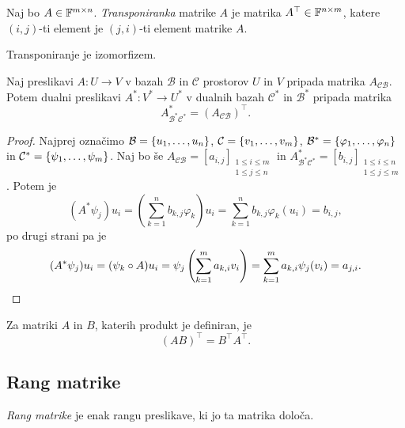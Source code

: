 \documentclass[12pt, a4paper]{article}
\begin{document}
\begin{definicija}
Naj bo $A\in\mathbb{F}^{m\times n}$. \emph{Transponiranka} matrike $A$ je matrika $A^\top\in\mathbb{F}^{n\times m}$, katere $(i,j)$-ti element je $(j,i)$-ti element matrike $A$.
\end{definicija}

\begin{posledica}
Transponiranje je izomorfizem.
\end{posledica}

\begin{izrek}
Naj preslikavi $A\colon U\to V$ v bazah $\mathcal{B}$ in $\mathcal{C}$ prostorov $U$ in $V$ pripada matrika $A_{\mathcal{CB}}$. Potem dualni preslikavi $A^*\colon V^*\to U^*$ v dualnih bazah $\mathcal{C}^*$ in $\mathcal{B}^*$ pripada matrika
\[
A^*_{\mathcal{B}^*\mathcal{C}^*}=(A_{\mathcal{CB}})^\top.
\]
\end{izrek}

\begin{proof}
Najprej označimo $\mathcal{B}=\left\{u_1,\dots,u_n\right\}$, $\mathcal{C}=\left\{v_1,\dots,v_m\right\}$, $\mathcal{B}^*=\left\{\varphi_1,\dots,\varphi_n\right\}$ in $\mathcal{C}^*=\left\{\psi_1,\dots,\psi_m\right\}$. Naj bo še $A_{\mathcal{CB}}=[a_{i,j}]_{
\substack{
1\leq i\leq m \\
1\leq j\leq n}}$ in 
$A^*_{\mathcal{B}^*\mathcal{C}^*}=[b_{i,j}]_{
\substack{
1\leq i\leq n \\
1\leq j\leq m}}$. Potem je
\[
(A^*\psi_j)u_i=\left(\sum_{k=1}^n b_{k,j}\varphi_k\right)u_i
=\sum_{k=1}^n b_{k,j}\varphi_k(u_i)
=b_{i,j},
\]
po drugi strani pa je
\[
(A^*\psi_j)u_i=(\psi_k\circ A)u_i
=\psi_j\left(\sum_{k=1}^m a_{k,i}v_i\right)
=\sum_{k=1}^m a_{k,i}\psi_j(v_i)
=a_{j,i}.\qedhere
\]
\end{proof}

\begin{posledica}
Za matriki $A$ in $B$, katerih produkt je definiran, je
\[
(AB)^\top=B^\top A^\top.
\]
\end{posledica}

\newpage

\subsection{Rang matrike}

\begin{definicija}
\emph{Rang matrike} je enak rangu preslikave, ki jo ta matrika določa.
\end{definicija}
\end{document}
